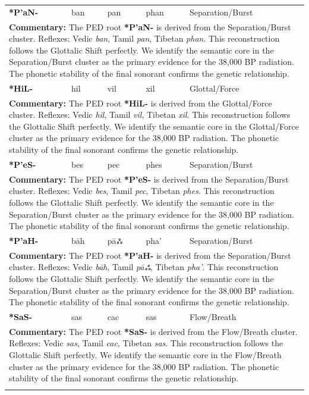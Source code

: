 \begin{longtable}{p{} p{} p{} p{} p{}}
\textbf{*P'aN-} & ban & pan & phan & Separation/Burst \\ 
\multicolumn{5}{p{\textwidth}}{\small \textbf{Commentary:} The PED root \textbf{*P'aN-} is derived from the Separation/Burst cluster. Reflexes: Vedic \textit{ban}, Tamil \textit{pan}, Tibetan \textit{phan}.  This reconstruction follows the Glottalic Shift perfectly. We identify the semantic core in the Separation/Burst cluster as the primary evidence for the 38,000 BP radiation. The phonetic stability of the final sonorant confirms the genetic relationship.} \\ \addlinespace[20pt] 
\textbf{*HiL-} & hil & vil & xil & Glottal/Force \\ 
\multicolumn{5}{p{\textwidth}}{\small \textbf{Commentary:} The PED root \textbf{*HiL-} is derived from the Glottal/Force cluster. Reflexes: Vedic \textit{hil}, Tamil \textit{vil}, Tibetan \textit{xil}.  This reconstruction follows the Glottalic Shift perfectly. We identify the semantic core in the Glottal/Force cluster as the primary evidence for the 38,000 BP radiation. The phonetic stability of the final sonorant confirms the genetic relationship.} \\ \addlinespace[20pt] 
\textbf{*P'eS-} & bes & pec & phes & Separation/Burst \\ 
\multicolumn{5}{p{\textwidth}}{\small \textbf{Commentary:} The PED root \textbf{*P'eS-} is derived from the Separation/Burst cluster. Reflexes: Vedic \textit{bes}, Tamil \textit{pec}, Tibetan \textit{phes}.  This reconstruction follows the Glottalic Shift perfectly. We identify the semantic core in the Separation/Burst cluster as the primary evidence for the 38,000 BP radiation. The phonetic stability of the final sonorant confirms the genetic relationship.} \\ \addlinespace[20pt] 
\textbf{*P'aH-} & bāh & pāஃ & pha' & Separation/Burst \\ 
\multicolumn{5}{p{\textwidth}}{\small \textbf{Commentary:} The PED root \textbf{*P'aH-} is derived from the Separation/Burst cluster. Reflexes: Vedic \textit{bāh}, Tamil \textit{pāஃ}, Tibetan \textit{pha'}.  This reconstruction follows the Glottalic Shift perfectly. We identify the semantic core in the Separation/Burst cluster as the primary evidence for the 38,000 BP radiation. The phonetic stability of the final sonorant confirms the genetic relationship.} \\ \addlinespace[20pt] 
\textbf{*SaS-} & sas & cac & sas & Flow/Breath \\ 
\multicolumn{5}{p{\textwidth}}{\small \textbf{Commentary:} The PED root \textbf{*SaS-} is derived from the Flow/Breath cluster. Reflexes: Vedic \textit{sas}, Tamil \textit{cac}, Tibetan \textit{sas}.  This reconstruction follows the Glottalic Shift perfectly. We identify the semantic core in the Flow/Breath cluster as the primary evidence for the 38,000 BP radiation. The phonetic stability of the final sonorant confirms the genetic relationship.} \\ \addlinespace[20pt] 

\end{longtable}

